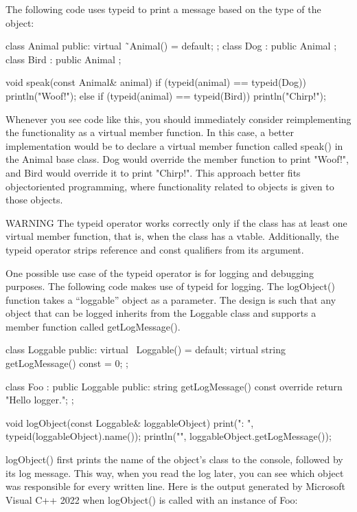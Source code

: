 The following code uses typeid to print a message based on the type of the object:

\begin{cpp}
class Animal { public: virtual ˜Animal() = default; };
class Dog : public Animal {};
class Bird : public Animal {};

void speak(const Animal& animal)
{
    if (typeid(animal) == typeid(Dog)) {
        println("Woof!");
    } else if (typeid(animal) == typeid(Bird)) {
        println("Chirp!");
    }
}
\end{cpp}

Whenever you see code like this, you should immediately consider reimplementing the functionality as a virtual member function. In this case, a better implementation would be to declare a virtual member function called speak() in the Animal base class. Dog would override the member function to print "Woof!", and Bird would override it to print "Chirp!". This approach better fits objectoriented programming, where functionality related to objects is given to those objects.

\begin{myWarning}{WARNING}
 The typeid operator works correctly only if the class has at least one virtual member function, that is, when the class has a vtable. Additionally, the typeid operator strips reference and const qualifiers from its argument.
\end{myWarning}

One possible use case of the typeid operator is for logging and debugging purposes. The following code makes use of typeid for logging. The logObject() function takes a “loggable” object as a parameter. The design is such that any object that can be logged inherits from the Loggable class and supports a member function called getLogMessage().

\begin{cpp}
class Loggable
{
    public:
        virtual ~Loggable() = default;
        virtual string getLogMessage() const = 0;
};

class Foo : public Loggable
{
    public:
        string getLogMessage() const override { return "Hello logger."; }
};

void logObject(const Loggable& loggableObject)
{
    print("{}: ", typeid(loggableObject).name());
    println("{}", loggableObject.getLogMessage());
}
\end{cpp}

logObject() first prints the name of the object’s class to the console, followed by its log message.
This way, when you read the log later, you can see which object was responsible for every written line. Here is the output generated by Microsoft Visual C++ 2022 when logObject() is called with an instance of Foo:

